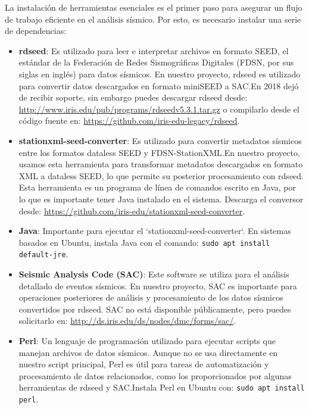 \documentclass[a4paper,11pt]{refart}
\begin{document}
La instalación de herramientas esenciales es el primer paso para asegurar un flujo de trabajo eficiente en el análisis sísmico. Por esto, es necesario instalar una serie de dependencias:

\begin{itemize}
  \item \textbf{rdseed}: Es utilizado para leer e interpretar archivos en formato SEED, el estándar de la Federación de Redes Sismográficas Digitales (FDSN, por sus siglas en inglés) para datos sísmicos. En nuestro proyecto, rdseed es utilizado para convertir datos descargados en formato miniSEED a SAC.\@ En 2018 dejó de recibir soporte, sin embargo puedes descargar rdseed desde: \url{http://www.iris.edu/pub/programs/rdseedv5.3.1.tar.gz} o compilarlo desde el código fuente en: \url{https://github.com/iris-edu-legacy/rdseed}.

  \item \textbf{stationxml-seed-converter}: Es utilizado para convertir metadatos sísmicos entre los formatos dataless SEED y FDSN-StationXML.\@ En nuestro proyecto, usamos esta herramienta para transformar metadatos descargados en formato XML a dataless SEED, lo que permite su posterior procesamiento con rdseed. Esta herramienta es un programa de línea de comandos escrito en Java, por lo que es importante tener Java instalado en el sistema. Descarga el conversor desde: \url{https://github.com/iris-edu/stationxml-seed-converter}.

  \item \textbf{Java}: Importante para ejecutar el `stationxml-seed-converter`. En sistemas basados en Ubuntu, instala Java con el comando: \texttt{sudo apt install default-jre}.

  \item \textbf{Seismic Analysis Code (SAC)}: Este software se utiliza para el análisis detallado de eventos sísmicos. En nuestro proyecto, SAC es importante para operaciones posteriores de análisis y procesamiento de los datos sísmicos convertidos por rdseed. SAC no está disponible públicamente, pero puedes solicitarlo en: \url{http://ds.iris.edu/ds/nodes/dmc/forms/sac/}.

  \item \textbf{Perl}: Un lenguaje de programación utilizado para ejecutar scripts que manejan archivos de datos sísmicos. Aunque no se usa directamente en nuestro script principal, Perl es útil para tareas de automatización y procesamiento de datos relacionados, como los proporcionados por algunas herramientas de rdseed y SAC.\@ Instala Perl en Ubuntu con: \texttt{sudo apt install perl}.
\end{itemize}
\end{document}
